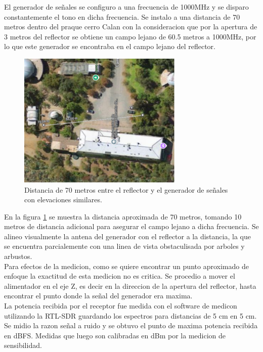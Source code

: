 El generador de señales se configuro a una frecuencia de 1000MHz y se disparo constantemente el tono en dicha frecuencia. Se instalo a una distancia de 70 metros dentro del praque cerro Calan con la consideracion que por la apertura de 3 metros del reflector se obtiene un campo lejano de 60.5 metros a 1000MHz, por lo que este generador se encontraba en el campo lejano del reflector.\\

\begin{figure}
    \centering
    \includegraphics[width=0.7\textwidth]{img/70m_measure}
    \caption{Distancia de 70 metros entre el reflector y el generador de señales con elevaciones similares.}
    \label{fig:70m_measure}
\end{figure} 

En la figura \ref{fig:70m_measure} se muestra la distancia aproximada de 70 metros, tomando 10 metros de distancia adicional para asegurar el campo lejano a dicha frecuencia. Se alineo visualmente la antena del generador con el reflector a la distancia, la que se encuentra parcialemente con una linea de vista obstaculisada por arboles y arbustos.\\

Para efectos de la medicion, como se quiere encontrar un punto aproximado de enfoque la exactitud de esta medicion no es critica. Se procedio a mover el alimentador en el eje Z, es decir en la direccion de la apertura del reflector, hasta encontrar el punto donde la señal del generador era maxima.\\

La potencia recibida por el receptor fue medida con el software de medicon utilizando la RTL-SDR guardando los espectros para distancias de 5 cm en 5 cm. Se midio la razon señal a ruido y se obtuvo el punto de maxima potencia recibida en dBFS. Medidas que luego son calibradas en dBm por la medicion de sensibilidad.\\


